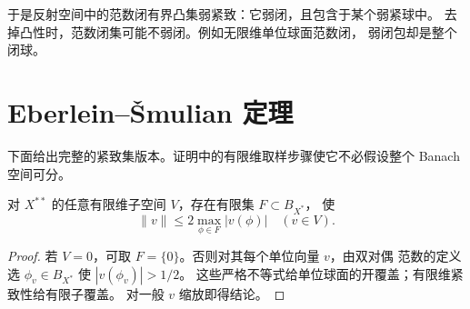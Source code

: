 于是反射空间中的范数闭有界凸集弱紧致：它弱闭，且包含于某个弱紧球中。
去掉凸性时，范数闭集可能不弱闭。例如无限维单位球面范数闭，
弱闭包却是整个闭球。

\section{Eberlein--Šmulian 定理}

下面给出完整的紧致集版本。证明中的有限维取样步骤使它不必假设整个
Banach 空间可分。

\begin{lemma}\label{lem:finite-norming-samples}
对 \(X^{**}\) 的任意有限维子空间 \(V\)，存在有限集 \(F\subset B_{X^*}\)，
使
\[
 \|v\|\le2\max_{\phi\in F}|v(\phi)|\quad(v\in V).
\]
\end{lemma}
\begin{proof}
若 \(V=0\)，可取 \(F=\{0\}\)。否则对其每个单位向量 \(v\)，由双对偶
范数的定义选 \(\phi_v\in B_{X^*}\) 使 \(|v(\phi_v)|>1/2\)。
这些严格不等式给单位球面的开覆盖；有限维紧致性给有限子覆盖。
对一般 \(v\) 缩放即得结论。
\end{proof}

